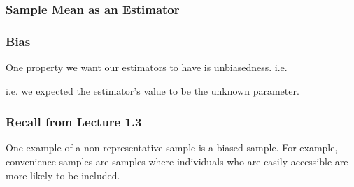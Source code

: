 \documentclass[slides]{beamer}
\newcommand{\blue}[1]{\textcolor{blue2}{#1}}
\newcommand{\E}{\mathbb{E}}
\newcommand{\Var}{\mbox{Var}}
\begin{document}
\begin{frame}
\frametitle{Sample Mean as an Estimator}

%
%
%
%
\end{frame}


\begin{frame}
\frametitle{Bias}
One property we want our estimators to have is \blue{unbiasedness}.  i.e.

\vspace{2.5cm}


i.e. we expected the estimator's value to be the unknown parameter.  

\end{frame}


\begin{frame}
\frametitle{Recall from Lecture 1.3}

One example of a non-representative sample is a \blue{biased sample}. For example, \blue{convenience samples} are samples where individuals who are easily accessible are more likely to be included.  

\end{frame}
\end{document}
